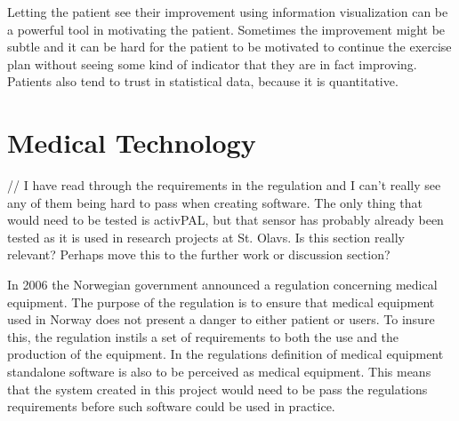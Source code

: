 Letting the patient see their improvement using information visualization can be a powerful tool in motivating the patient. Sometimes the improvement might be subtle and it can be hard for the patient to be motivated to continue the exercise plan without seeing some kind of indicator that they are in fact improving. Patients also tend to trust in statistical data, because it is quantitative. 

\section{Medical Technology}
// I have read through the requirements in the regulation and I can't really see any of them being hard to pass when creating software. The only thing that would need to be tested is activPAL, but that sensor has probably already been tested as it is used in research projects at St. Olavs. Is this section really relevant? Perhaps move this to the further work or discussion section?

In 2006 the Norwegian government announced a regulation concerning medical equipment. The purpose of the regulation is to ensure that medical equipment used in Norway does not present a danger to either patient or users. To insure this, the regulation instils a set of requirements to both the use and the production of the equipment. In the regulations definition of medical equipment standalone software is also to be perceived as medical equipment. This means that the system created in this project would need to be pass the regulations requirements before such software could be used in practice. 
